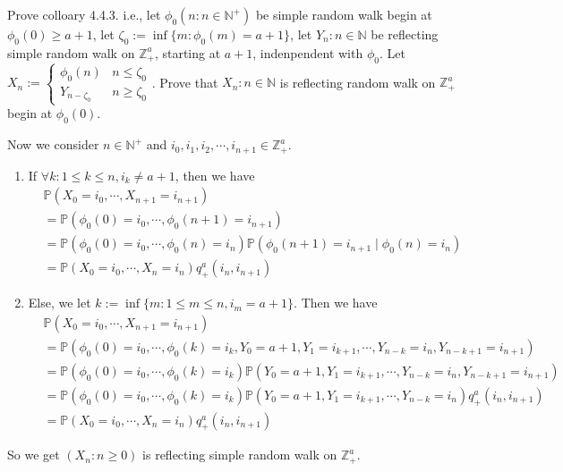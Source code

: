 \documentclass{ctexart}
\begin{document}
\begin{problem}\label{pro:4}
  Prove colloary 4.4.3. i.e., let \(\phi_0(n:n \in \mathbb{N}^+)\) be simple random walk begin at \(\phi_0(0) \geq a+1\),
  let \(\zeta_0:=\inf \{m:\phi_0(m)=a+1\}\), let \(Y_n:n \in \mathbb{N}\) be reflecting simple random walk on \(\mathbb{Z}^a_+\), starting at \(a+1\), indenpendent with \(\phi_0\).
  Let \(X_n:=\begin{cases}
    \phi_0(n)     & n \leq \zeta_0 \\
    Y_{n-\zeta_0} & n \geq \zeta_0
  \end{cases}\).
  Prove that \(X_n:n \in \mathbb{N}\) is reflecting random walk on \(\mathbb{Z}^a_+\) begin at \(\phi_0(0)\).
\end{problem}
\begin{solution}
  Now we consider \(n \in \mathbb{N}^+\) and \(i_0,i_1,i_2,\cdots,i_{n+1}  \in \mathbb{Z}^a_+\).
  \begin{enumerate}
    \item If \(\forall k:1 \leq k \leq n,i_k \neq a+1\), then we have
      \[
        \begin{aligned}
           & \mathbb{P}(X_0=i_0,\cdots,X_{n+1} =i_{n+1} )                                                      \\
           & =\mathbb{P}(\phi_0(0)=i_0,\cdots,\phi_0(n+1)=i_{n+1} )                                            \\
           & =\mathbb{P}(\phi_0(0)=i_0,\cdots,\phi_0(n)=i_n)\mathbb{P}(\phi_0(n+1)=i_{n+1} \mid \phi_0(n)=i_n) \\
           & =\mathbb{P}(X_0=i_0,\cdots,X_n=i_n)q^a_+(i_n,i_{n+1})
        \end{aligned}
      \]
    \item Else, we let \(k:=\inf \{m:1 \leq m \leq n,i_m=a+1\}\).
      Then we have
      \[
        \begin{aligned}
           & \mathbb{P}(X_0=i_0,\cdots,X_{n+1}=i_{n+1})                                                                              \\
           & =\mathbb{P}(\phi_0(0)=i_0,\cdots,\phi_0(k)=i_k,Y_0=a+1,Y_1=i_{k+1},\cdots,Y_{n-k}=i_{n},Y_{n-k+1}=i_{n+1})              \\
           & =\mathbb{P}(\phi_0(0)=i_0,\cdots,\phi_0(k)=i_k)\mathbb{P}(Y_0=a+1,Y_1=i_{k+1},\cdots,Y_{n-k}=i_{n},Y_{n-k+1}=i_{n+1})   \\
           & =\mathbb{P}(\phi_0(0)=i_0,\cdots,\phi_0(k)=i_k)\mathbb{P}(Y_0=a+1,Y_1=i_{k+1},\cdots,Y_{n-k}=i_{n}) q^a_+(i_n,i_{n+1} ) \\
           & =\mathbb{P}(X_0=i_0,\cdots,X_n=i_n)q^a_+(i_n,i_{n+1})
        \end{aligned}
      \]
  \end{enumerate}
  So we get \((X_n:n \geq 0)\) is reflecting simple random walk on \(\mathbb{Z}^a_+\).
\end{solution}
\end{document}
